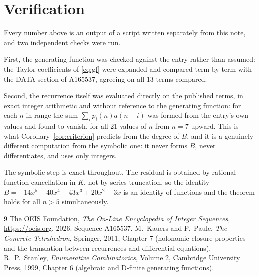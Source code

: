 \documentclass[11pt,a4paper]{article}
\theoremstyle{plain}
\theoremstyle{definition}
\begin{document}
\section{Verification}

Every number above is an output of a script written separately from this note, and two
independent checks were run.

First, the generating function was checked against the entry rather than assumed: the
Taylor coefficients of \eqref{eq:gf} were expanded and compared term by term with the DATA
section of A165537, agreeing on all 13 terms compared.

Second, the recurrence itself was evaluated directly on the published terms, in exact
integer arithmetic and without reference to the generating function: for each $n$ in range
the sum $\sum_{i}p_{i}(n)a(n-i)$ was formed from the entry's own values and found to
vanish, for all 21 values of $n$ from $n=7$ upward. This is what
Corollary~\ref{cor:criterion} predicts from the degree of $B$, and it is a genuinely
different computation from the symbolic one: it never forms $B$, never differentiates, and
uses only integers.

The symbolic step is exact throughout. The residual is obtained by rational-function
cancellation in $K$, not by series truncation, so the identity $B=- 14 x^{5} + 40 x^{4} - 43 x^{3} + 20 x^{2} - 3 x$ is an
identity of functions and the theorem holds for all $n>5$ simultaneously.

\begin{thebibliography}{9}
 The OEIS Foundation, \emph{The On-Line Encyclopedia of Integer Sequences},
\url{https://oeis.org}, 2026. Sequence A165537.
 M.~Kauers and P.~Paule, \emph{The Concrete Tetrahedron}, Springer, 2011,
Chapter 7 (holonomic closure properties and the translation between recurrences and
differential equations).
 R.~P.~Stanley, \emph{Enumerative Combinatorics}, Volume 2, Cambridge
University Press, 1999, Chapter 6 (algebraic and D-finite generating functions).
\end{thebibliography}
\end{document}
